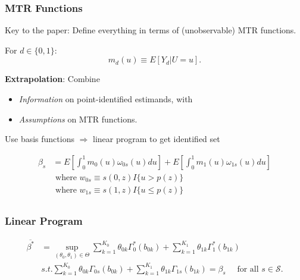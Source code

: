 \documentclass[11pt, aspectratio=169]{beamer}
\begin{document}
\begin{frame}
    \frametitle{MTR Functions}

    Key to the paper: Define everything in terms of (unobservable) MTR functions.

    For $d\in\{0,1\}$:
    \begin{equation}
        m_d(u) \equiv E[Y_d | U=u].
    \end{equation}

    \vspace{0.5cm}

    \textbf{Extrapolation}: Combine
    \begin{itemize}
        \item \textit{Information} on point-identified estimands, with
        \item \textit{Assumptions} on MTR functions.
    \end{itemize}

    \vspace{0.5cm}

    Use basis functions $\Rightarrow$ linear program to get identified set

\end{frame}

\begin{frame}

\end{frame}

\begin{frame}
    {\begin{align*}
        \beta_s &= E\left[\int_0^1 m_0(u)\omega_{0s}(u)du\right] + E\left[\int_0^1 m_1(u)\omega_{1s}(u)du\right] \\
        & \text{ where } w_{0s} \equiv s(0,z)I\{u>p(z)\} \\
        & \text{ where } w_{1s} \equiv s(1,z)I\{u\leq p(z)\} \\
    \end{align*}
    }

\end{frame}

\begin{frame}
    \frametitle{Linear Program}

    \begin{align*}
        \overline{\beta^*} & = \sup_{(\theta_0, \theta_1) \in \Theta}\sum_{k=1}^{K_0} \theta_{0k}\Gamma^*_0(b_{0k}) + \sum_{k=1}^{K_1} \theta_{1k}\Gamma_1^*(b_{1k}) \\
        & s.t. \sum_{k=1}^{K_0} \theta_{0k}\Gamma_{0s}(b_{0k}) + \sum_{k=1}^{K_1} \theta_{1k} \Gamma_{1s}(b_{1k}) = \beta_s \quad \text{ for all } s\in\mathcal{S}.
    \end{align*}

\end{frame}
\end{document}
